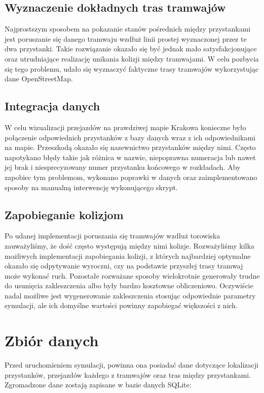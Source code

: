 \documentclass[12pt,a4paper]{article}
\begin{document}
        \subsection{Wyznaczenie dokładnych tras tramwajów}
            Najprostszym sposobem na pokazanie stanów pośrednich między przystankami jest poruszanie się danego tramwaju wzdłuż linii prostej wyznaczonej przez te dwa przystanki. Takie rozwiązanie okazało się być jednak mało satysfakcjonujące oraz utrudniające realizację unikania kolizji między tramwajami. W celu pozbycia się tego problemu, udało się wyznaczyć faktyczne trasy tramwajów wykorzystując dane OpenStreetMap.

        \subsection {Integracja danych}
            W celu wizualizacji przejazdów na prawdziwej mapie Krakowa konieczne było połączenie odpowiednich przystanków z bazy danych wraz z ich odpowiednikami na mapie. Przeszkodą okazało się nazewnictwo przystanków między nimi. Często napotykano błędy takie jak różnica w nazwie, niepoprawna numeracja lub nawet jej brak i niesprecyzowany numer przystanku końcowego w rozkładach. Aby zapobiec tym problemom, wykonano poprawki w danych oraz zaimplementowano sposoby na manualną interwencję wykonującego skrypt.

        \subsection{Zapobieganie kolizjom}
            Po udanej implementacji poruszania się tramwajów wzdłuż torowiska zauważyliśmy, że dość często występują między nimi kolizje. Rozważyliśmy kilka możliwych implementacji zapobiegania kolizji, z których najbardziej optymalne okazało się odpytywanie wyroczni, czy na podstawie przyszłej trasy tramwaj może wykonać ruch. Pozostałe rozważane sposoby wielokrotnie generowały trudne do usunięcia zakleszczenia albo były bardzo kosztowne obliczeniowo. Oczywiście nadal możliwe jest wygenerowanie zakleszczenia stosując odpowiednie parametry symulacji, ale ich domyślne wartości powinny zapobiegać większości z nich.

    \newpage

    \section{Zbiór danych}
        Przed uruchomieniem symulacji, powinna ona posiadać dane dotyczące lokalizacji przystanków, przejazdów każdego z tramwajów oraz tras między przystankami. Zgromadzone dane zostają zapisane w bazie danych SQLite:
\end{document}
